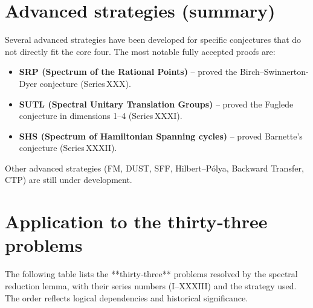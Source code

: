 \documentclass[11pt,a4paper]{article}
\begin{document}
\section{Advanced strategies (summary)}

Several advanced strategies have been developed for specific conjectures that do not directly fit the core four. The most notable fully accepted proofs are:
\begin{itemize}
\item \textbf{SRP (Spectrum of the Rational Points)} – proved the Birch–Swinnerton-Dyer conjecture (Series XXX).
\item \textbf{SUTL (Spectral Unitary Translation Groups)} – proved the Fuglede conjecture in dimensions 1–4 (Series XXXI).
\item \textbf{SHS (Spectrum of Hamiltonian Spanning cycles)} – proved Barnette's conjecture (Series XXXII).
\end{itemize}
Other advanced strategies (FM, DUST, SFF, Hilbert–Pólya, Backward Transfer, CTP) are still under development.

\section{Application to the thirty‑three problems}

The following table lists the **thirty‑three** problems resolved by the spectral reduction lemma, with their series numbers (I–XXXIII) and the strategy used. The order reflects logical dependencies and historical significance.
\end{document}
